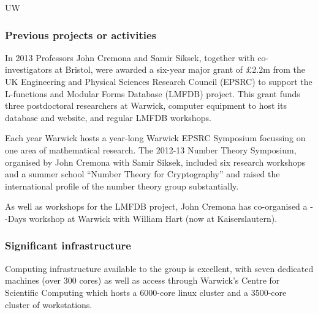 \begin{sitedescription}{UW}
\subsubsection*{Previous projects or activities}

\begin{compactenum}
\item
In 2013 Professors John Cremona and Samir Siksek, together with
co-investigators at Bristol, were awarded a six-year major grant of
\pounds 2.2m from the UK Engineering and Physical Sciences Research Council
(EPSRC) to support the L-functions and Modular Forms Database (LMFDB)
project.  This grant funds three postdoctoral researchers at Warwick,
computer equipment to host its database and website, and regular LMFDB
workshops.
\item
Each year Warwick hosts a year-long Warwick EPSRC Symposium focussing
on one area of mathematical research.  The 2012-13 Number Theory
Symposium, organised by John Cremona with Samir Siksek, included six
research workshops and a summer school ``Number Theory for
Cryptography'' and raised the international profile of the number
theory group substantially.
\item
As well as workshops for the LMFDB project, John Cremona has
co-organised a -\Sage-Days workshop at Warwick with William Hart
(now at Kaiserslautern).
\end{compactenum}

\subsubsection*{Significant infrastructure}

Computing infrastructure available to the group is excellent, with
seven dedicated machines (over 300 cores) as well as access through
Warwick's Centre for Scientific Computing which hosts a 6000-core
linux cluster and a 3500-core cluster of workstations.
\end{sitedescription}

\begin{draft}
\end{draft}







